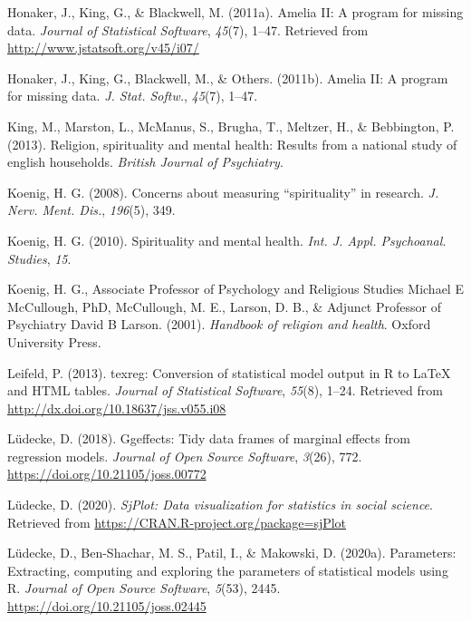 \documentclass[
  english,
  man]{apa6}
\begin{document}
\leavevmode\hypertarget{ref-R-Amelia}{}%
Honaker, J., King, G., \& Blackwell, M. (2011a). Amelia II: A program for missing data. \emph{Journal of Statistical Software}, \emph{45}(7), 1--47. Retrieved from \url{http://www.jstatsoft.org/v45/i07/}

\leavevmode\hypertarget{ref-Honaker2011-yu}{}%
Honaker, J., King, G., Blackwell, M., \& Others. (2011b). Amelia II: A program for missing data. \emph{J. Stat. Softw.}, \emph{45}(7), 1--47.

\leavevmode\hypertarget{ref-King2013-cg}{}%
King, M., Marston, L., McManus, S., Brugha, T., Meltzer, H., \& Bebbington, P. (2013). Religion, spirituality and mental health: Results from a national study of english households. \emph{British Journal of Psychiatry}.

\leavevmode\hypertarget{ref-Koenig2008-lv}{}%
Koenig, H. G. (2008). Concerns about measuring ``spirituality'' in research. \emph{J. Nerv. Ment. Dis.}, \emph{196}(5), 349.

\leavevmode\hypertarget{ref-Koenig2010-gk}{}%
Koenig, H. G. (2010). Spirituality and mental health. \emph{Int. J. Appl. Psychoanal. Studies}, \emph{15}.

\leavevmode\hypertarget{ref-Koenig2001-ow}{}%
Koenig, H. G., Associate Professor of Psychology and Religious Studies Michael E McCullough, PhD, McCullough, M. E., Larson, D. B., \& Adjunct Professor of Psychiatry David B Larson. (2001). \emph{Handbook of religion and health}. Oxford University Press.

\leavevmode\hypertarget{ref-R-texreg}{}%
Leifeld, P. (2013). texreg: Conversion of statistical model output in R to LaTeX and HTML tables. \emph{Journal of Statistical Software}, \emph{55}(8), 1--24. Retrieved from \url{http://dx.doi.org/10.18637/jss.v055.i08}

\leavevmode\hypertarget{ref-R-ggeffects}{}%
Lüdecke, D. (2018). Ggeffects: Tidy data frames of marginal effects from regression models. \emph{Journal of Open Source Software}, \emph{3}(26), 772. \url{https://doi.org/10.21105/joss.00772}

\leavevmode\hypertarget{ref-R-sjPlot}{}%
Lüdecke, D. (2020). \emph{SjPlot: Data visualization for statistics in social science}. Retrieved from \url{https://CRAN.R-project.org/package=sjPlot}

\leavevmode\hypertarget{ref-R-parameters}{}%
Lüdecke, D., Ben-Shachar, M. S., Patil, I., \& Makowski, D. (2020a). Parameters: Extracting, computing and exploring the parameters of statistical models using R. \emph{Journal of Open Source Software}, \emph{5}(53), 2445. \url{https://doi.org/10.21105/joss.02445}
\end{document}
